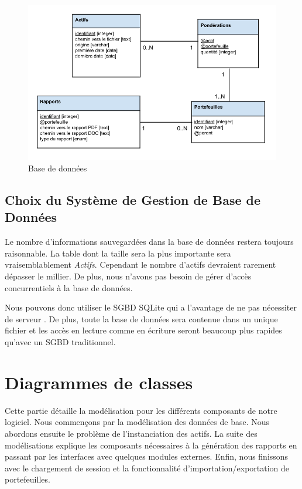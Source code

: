 \documentclass[a4paper,titlepage,french]{report}
\begin{document}
\begin{figure}
  	\center
  	\includegraphics[width=1\textwidth]{base-donnees.png}
  	\caption{Base de données}
  	\label{fig:base-donnees}
\end{figure}


\subsection{Choix du Système de Gestion de Base de Données}

Le nombre d'informations sauvegardées dans la base de données restera toujours raisonnable.
La table dont la taille sera la plus importante sera vraisemblablement \textit{Actifs}.
Cependant le nombre d'actifs devraient rarement dépasser le millier.
De plus, nous n'avons pas besoin de gérer d'accès concurrentiels à la base de données.

Nous pouvons donc utiliser le SGBD SQLite qui a l'avantage de ne pas nécessiter de serveur \cite{website:SQLite}.
De plus, toute la base de données sera contenue dans un unique fichier et les accès en lecture comme en écriture seront beaucoup plus rapides qu'avec un SGBD traditionnel.


\section{Diagrammes de classes}

Cette partie détaille la modélisation pour les différents composants de notre logiciel.
Nous commençons par la modélisation des données de base. Nous abordons ensuite le problème de l'instanciation des actifs.
La suite des modélisations explique les composants nécessaires à la génération des rapports en passant par les interfaces avec quelques modules externes.
Enfin, nous finissons avec le chargement de session et la fonctionnalité d'importation/exportation de portefeuilles.
\end{document}
